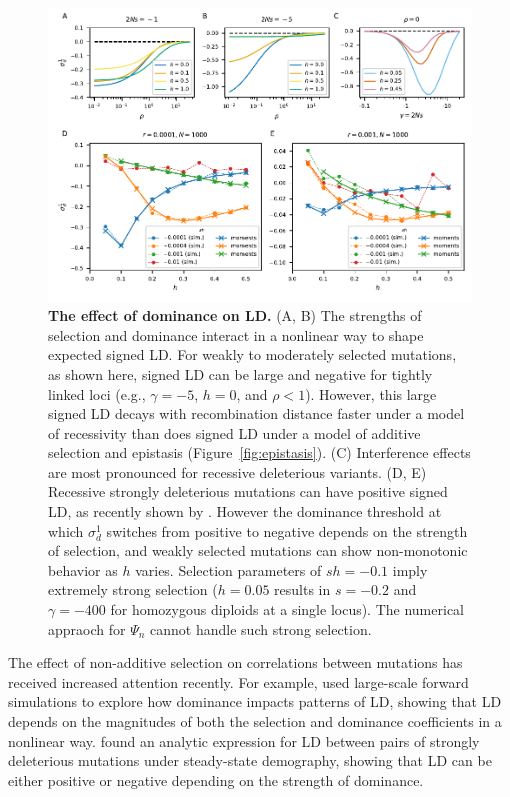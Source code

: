 \documentclass[]{article}
\begin{document}
\begin{figure}[tb!]
    \internallinenumbers
    \centering
    \includegraphics{../figures/dominance_roze}
    \caption{
        \textbf{The effect of dominance on LD.}
        (A, B) The strengths of selection and dominance interact in a nonlinear way
        to shape expected signed LD. For weakly to moderately selected mutations,
        as shown here, signed LD can be large and negative for tightly linked loci
        (e.g., \(\gamma=-5\), \(h=0\), and \(\rho < 1\)). However, this large signed
        LD decays with recombination distance faster under a model of recessivity
        than does signed LD under a model of additive selection and
        epistasis (Figure~\ref{fig:epistasis}).
        (C) Interference effects are most pronounced for recessive deleterious
        variants.
        (D, E) Recessive strongly deleterious mutations can have positive signed
        LD, as recently shown by \citet{Roze2021-cf}.
        However the dominance threshold at which \(\sigma_d^1\) switches from
        positive to negative depends on the strength of selection, and weakly
        selected mutations can show non-monotonic behavior as $h$ varies.
        Selection parameters of \(sh=-0.1\) imply extremely strong selection
        (\(h=0.05\) results in \(s=-0.2\) and \(\gamma=-400\) for homozygous
        diploids at a single locus). The numerical appraoch for \(\Psi_n\)
        cannot handle such strong selection.
    }
    \label{fig:dominance}
\end{figure}

The effect of non-additive selection on correlations between mutations has
received increased attention recently. For example, \citet{Garcia2021-zn} used
large-scale forward simulations to explore how dominance impacts patterns of
LD, showing that LD depends on the magnitudes of both the selection and
dominance coefficients in a nonlinear way. \citet{Roze2021-cf} found an
analytic expression for LD between pairs of strongly deleterious mutations
under steady-state demography, showing that LD can be either positive or
negative depending on the strength of dominance.
\end{document}
